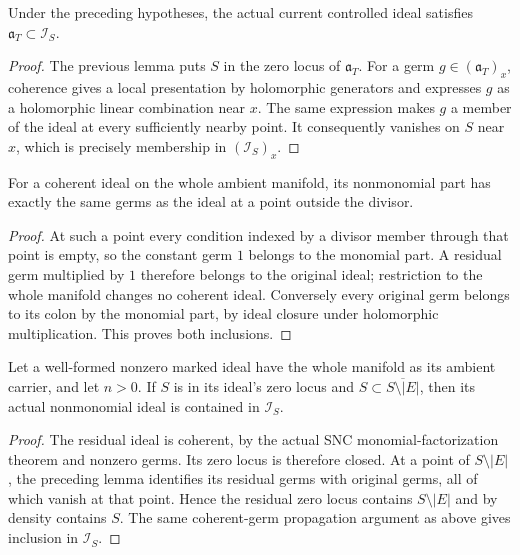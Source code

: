 \begin{lemma}
\label{hir:current-controlled-ideal-in-reduced-ideal}
\leanok
Under the preceding hypotheses, the actual current controlled ideal satisfies
$\mathfrak a_T\subset\mathcal I_S$.
\end{lemma}
\begin{proof}
The previous lemma puts $S$ in the zero locus of $\mathfrak a_T$.
For a germ $g\in(\mathfrak a_T)_x$, coherence gives a local presentation
by holomorphic generators and expresses $g$ as a holomorphic linear
combination near $x$. The same expression makes $g$ a member of the
ideal at every sufficiently nearby point. It consequently vanishes on
$S$ near $x$, which is precisely membership in $(\mathcal I_S)_x$.
\end{proof}

\begin{lemma}
\label{hir:residual-ideal-off-boundary}
\leanok
For a coherent ideal on the whole ambient manifold, its nonmonomial part
has exactly the same germs as the ideal at a point outside the divisor.
\end{lemma}
\begin{proof}
At such a point every condition indexed by a divisor member through that
point is empty, so the constant germ $1$ belongs to the monomial part.
A residual germ multiplied by $1$ therefore belongs to the original ideal;
restriction to the whole manifold changes no coherent ideal. Conversely
every original germ belongs to its colon by the monomial part, by ideal
closure under holomorphic multiplication. This proves both inclusions.
\end{proof}

\begin{lemma}
\label{hir:residual-ideal-in-dense-reduced-ideal}
\leanok
Let a well-formed nonzero marked ideal have the whole manifold as its
ambient carrier, and let $n>0$. If $S$ is in its ideal's zero locus and
$S\subset\overline{S\setminus|E|}$, then its actual nonmonomial ideal is
contained in $\mathcal I_S$.
\end{lemma}
\begin{proof}
The residual ideal is coherent, by the actual SNC monomial-factorization
theorem and nonzero germs. Its zero locus is therefore closed. At a point
of $S\setminus|E|$, the preceding lemma identifies its residual germs
with original germs, all of which vanish at that point. Hence the residual
zero locus contains $S\setminus|E|$ and by density contains $S$.
The same coherent-germ propagation argument as above gives inclusion in
$\mathcal I_S$.
\end{proof}

